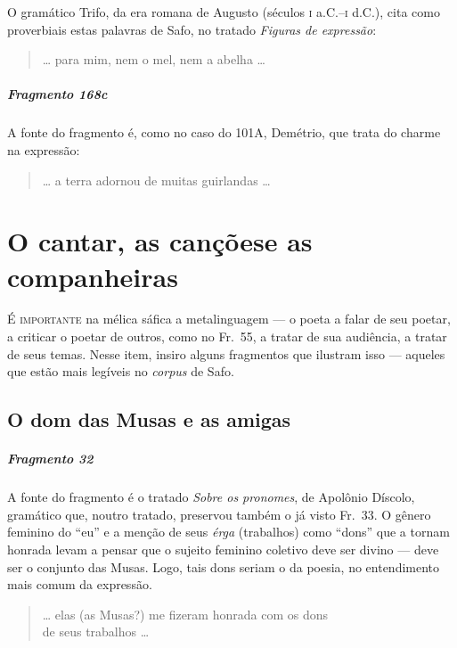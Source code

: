 {\small O gramático Trifo, da era romana de Augusto (séculos \textsc{i} a.C.--\textsc{i} d.C.), 
cita como proverbiais estas palavras de Safo, no tratado \textit{Figuras de expressão}:}

\begin{verse}
\ldots{} para mim, nem o mel, nem a abelha \ldots{}
\end{verse}

\paragraph{Fragmento 168c}

{\small A fonte do fragmento é, como no caso do 101A, Demétrio, que trata do charme na
expressão:}

\begin{verse}
\ldots{} a terra adornou de muitas guirlandas \ldots{}
\end{verse}


\chapter[O cantar, as canções e as companheiras]{O cantar, as canções\break e as companheiras}

\textsc{É importante} na mélica sáfica a metalinguagem --- o poeta a falar de seu
poetar, a criticar o poetar de outros, como no Fr.~55, a tratar de sua
audiência, a tratar de seus temas. Nesse item, insiro alguns fragmentos que
ilustram isso --- aqueles que estão mais legíveis no \textit{corpus} de Safo.

\section{O dom das Musas e as amigas}

\paragraph{Fragmento 32}

{\small A fonte do fragmento é o tratado \textit{Sobre os pronomes}, de Apolônio
Díscolo, gramático que, noutro tratado, preservou também o já visto Fr.~33. O
gênero feminino do “eu” e a menção de seus \textit{érga }(trabalhos) como
``dons” que a tornam honrada levam a pensar que o sujeito feminino
coletivo deve ser divino --- deve ser o conjunto das Musas. Logo, tais dons
seriam o da poesia, no entendimento mais comum da expressão.}

\begin{verse}
\ldots{} elas (as Musas?) me fizeram honrada com os dons\\
de seus trabalhos \ldots{}
\end{verse}

